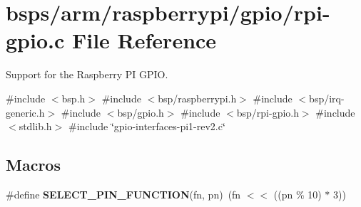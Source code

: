 \hypertarget{rpi-gpio_8c}{}\section{bsps/arm/raspberrypi/gpio/rpi-\/gpio.c File Reference}
\label{rpi-gpio_8c}


Support for the Raspberry PI G\+P\+IO.  


{\ttfamily \#include $<$bsp.\+h$>$}\newline
{\ttfamily \#include $<$bsp/raspberrypi.\+h$>$}\newline
{\ttfamily \#include $<$bsp/irq-\/generic.\+h$>$}\newline
{\ttfamily \#include $<$bsp/gpio.\+h$>$}\newline
{\ttfamily \#include $<$bsp/rpi-\/gpio.\+h$>$}\newline
{\ttfamily \#include $<$stdlib.\+h$>$}\newline
{\ttfamily \#include \char`\"{}gpio-\/interfaces-\/pi1-\/rev2.\+c\char`\"{}}\newline
\subsection*{Macros}
\begin{DoxyCompactItemize}
\item 
\mbox{\label{rpi-gpio_8c_a7f281e0e3c670edd450377b96e5133ae}} 
\#define {\bfseries S\+E\+L\+E\+C\+T\+\_\+\+P\+I\+N\+\_\+\+F\+U\+N\+C\+T\+I\+ON}(fn,  pn)~(fn $<$$<$ ((pn \% 10) $\ast$ 3))
\end{DoxyCompactItemize}
